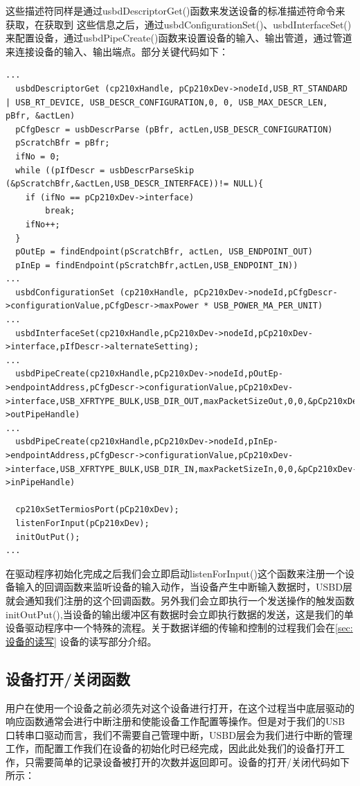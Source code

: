 这些描述符同样是通过usbdDescriptorGet()函数来发送设备的标准描述符命令来获取，在获取到
这些信息之后，通过usbdConfigurationSet()、usbdInterfaceSet()来配置设备，通过usbdPipeCreate()函数来设置设备的输入、输出管道，通过管道来连接设备的输入、输出端点。部分关键代码如下：
\lstset{language=C}
\begin{lstlisting}
...  
  usbdDescriptorGet (cp210xHandle, pCp210xDev->nodeId,USB_RT_STANDARD | USB_RT_DEVICE, USB_DESCR_CONFIGURATION,0, 0, USB_MAX_DESCR_LEN, pBfr, &actLen) 
  pCfgDescr = usbDescrParse (pBfr, actLen,USB_DESCR_CONFIGURATION)
  pScratchBfr = pBfr;
  ifNo = 0;
  while ((pIfDescr = usbDescrParseSkip (&pScratchBfr,&actLen,USB_DESCR_INTERFACE))!= NULL){
    if (ifNo == pCp210xDev->interface)
		break;
	ifNo++;
  }
  pOutEp = findEndpoint(pScratchBfr, actLen, USB_ENDPOINT_OUT)
  pInEp = findEndpoint(pScratchBfr,actLen,USB_ENDPOINT_IN))
...  
  usbdConfigurationSet (cp210xHandle, pCp210xDev->nodeId,pCfgDescr->configurationValue,pCfgDescr->maxPower * USB_POWER_MA_PER_UNIT)
...  
  usbdInterfaceSet(cp210xHandle,pCp210xDev->nodeId,pCp210xDev->interface,pIfDescr->alternateSetting);
...  
  usbdPipeCreate(cp210xHandle,pCp210xDev->nodeId,pOutEp->endpointAddress,pCfgDescr->configurationValue,pCp210xDev->interface,USB_XFRTYPE_BULK,USB_DIR_OUT,maxPacketSizeOut,0,0,&pCp210xDev->outPipeHandle)
...  
  usbdPipeCreate(cp210xHandle,pCp210xDev->nodeId,pInEp->endpointAddress,pCfgDescr->configurationValue,pCp210xDev->interface,USB_XFRTYPE_BULK,USB_DIR_IN,maxPacketSizeIn,0,0,&pCp210xDev->inPipeHandle)
  
  cp210xSetTermiosPort(pCp210xDev);
  listenForInput(pCp210xDev);
  initOutPut();
...
\end{lstlisting}

	在驱动程序初始化完成之后我们会立即启动listenForInput()这个函数来注册一个设备输入的回调函数来监听设备的输入动作，当设备产生中断输入数据时，USBD层就会通知我们注册的这个回调函数。另外我们会立即执行一个发送操作的触发函数initOutPut(),当设备的输出缓冲区有数据时会立即执行数据的发送，这是我们的单设备驱动程序中一个特殊的流程。关于数据详细的传输和控制的过程我们会在\autoref{sec:设备的读写} 设备的读写部分介绍。


\subsection{设备打开/关闭函数}

	用户在使用一个设备之前必须先对这个设备进行打开，在这个过程当中底层驱动的响应函数通常会进行中断注册和使能设备工作配置等操作。但是对于我们的USB口转串口驱动而言，我们不需要自己管理中断，USBD层会为我们进行中断的管理工作，而配置工作我们在设备的初始化时已经完成，因此此处我们的设备打开工作，只需要简单的记录设备被打开的次数并返回即可。设备的打开/关闭代码如下所示：
	
